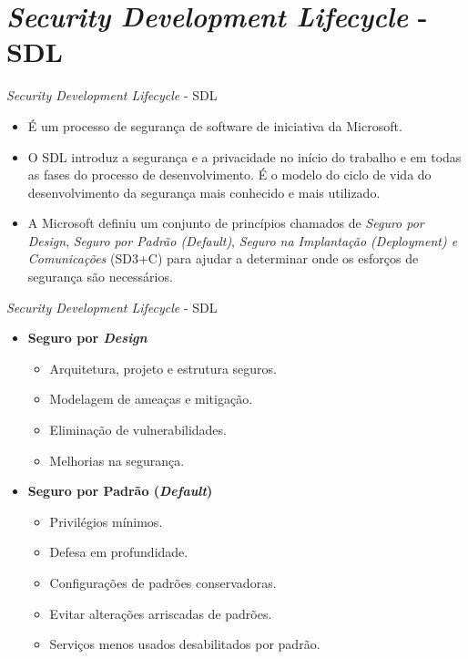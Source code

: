 \documentclass{beamer}
\begin{document}
\section{\textit{Security Development Lifecycle} - SDL}

\begin{frame}{\textit{Security Development Lifecycle} - SDL}
	\begin{itemize}
		\justifying
		\item<1> É um processo de segurança de software de iniciativa da Microsoft.
		\item<1> O SDL introduz a segurança e a privacidade no início do trabalho e em todas as fases do processo de desenvolvimento. É o modelo do ciclo de vida do desenvolvimento da segurança mais conhecido e mais utilizado.
		\item<2> A Microsoft definiu um conjunto de princípios chamados de \textit{Seguro por Design}, \textit{Seguro por Padrão (Default)}, \textit{Seguro na Implantação (Deployment) e Comunicações} (SD3+C) para ajudar a determinar onde os esforços de segurança são necessários.
	\end{itemize}
\end{frame}

\begin{frame}{\textit{Security Development Lifecycle} - SDL}
	\begin{itemize}
		\justifying
		\item \textbf{Seguro por \textit{Design}}
			\begin{itemize}
				\justifying
				\item<1> Arquitetura, projeto e estrutura seguros.
				\item<1> Modelagem de ameaças e mitigação.
				\item<1> Eliminação de vulnerabilidades.
				\item<1> Melhorias na segurança.
			\end{itemize}
		\item \textbf{Seguro por Padrão (\textit{Default})}
			\begin{itemize}
				\item<2> Privilégios mínimos.
				\item<2> Defesa em profundidade.
				\item<2> Configurações de padrões conservadoras.
				\item<2> Evitar alterações arriscadas de padrões.
				\item<2> Serviços menos usados desabilitados por padrão.
			\end{itemize}
	\end{itemize}
\end{frame}
\end{document}
